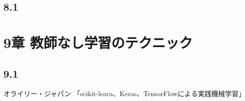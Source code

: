\documentclass[a4j,twocolumn]{jsarticle}
\begin{document}
\subsection{8.1}

\section{9章 教師なし学習のテクニック}
\subsection{9.1}




\begin{thebibliography}{}
オライリー・ジャパン 「scikit-learn、Keras、TensorFlowによる実践機械学習」
\end{thebibliography}
\end{document}
